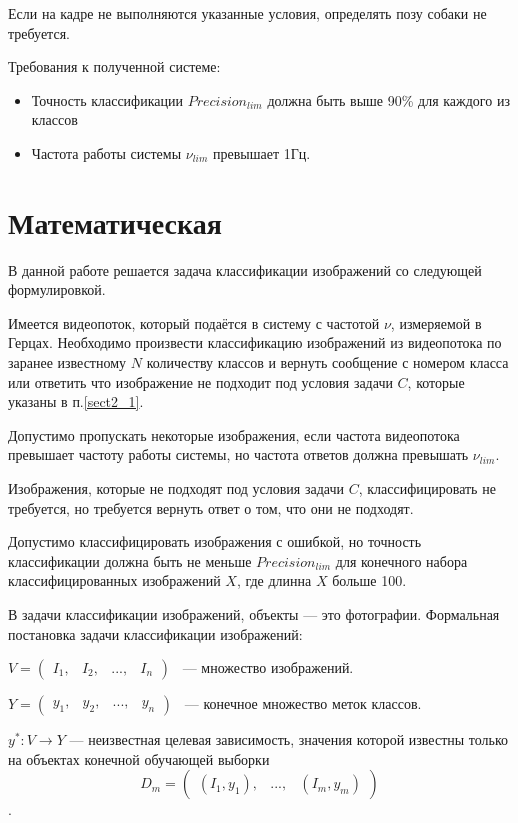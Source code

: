Если на кадре не выполняются указанные условия, определять позу собаки не требуется.

Требования к полученной системе:
\begin{itemize}
    \item Точность классификации $Precision_{lim}$ должна быть выше 90\% для каждого из классов
    \item Частота работы системы $\nu_{lim}$ превышает 1Гц.
\end{itemize}


\section{Математическая}\label{sect2_2}

В данной работе решается задача классификации изображений со следующей формулировкой. 

Имеется видеопоток, который подаётся в систему с частотой $\nu$, измеряемой в Герцах. Необходимо произвести классификацию изображений из видеопотока по заранее известному $N$ количеству классов и вернуть сообщение с номером класса или ответить что изображение не подходит под условия задачи $C$, которые указаны в п.\ref{sect2_1}. 

Допустимо пропускать некоторые изображения, если частота видеопотока превышает частоту работы системы, но частота ответов должна превышать $\nu_{lim}$. 

Изображения, которые не подходят под условия задачи $C$, классифицировать не требуется, но требуется вернуть ответ о том, что они не подходят. 

Допустимо классифицировать изображения с ошибкой, но точность классификации должна быть не меньше $Precision_{lim}$ для конечного набора классифицированных изображений $X$, где длинна $X$ больше 100.

В задачи классификации изображений, объекты — это фотографии. Формальная постановка задачи классификации изображений:

$ V = \begin{pmatrix} 
             I_1, & I_2, & ..., & I_n 
      \end{pmatrix}
$
~— множество изображений. 

$ Y = \begin{pmatrix}
                  y_1, & y_2, & ..., & y_n 
      \end{pmatrix}
$
~— конечное множество меток классов.

$y^{*} : V \rightarrow Y$ — неизвестная целевая зависимость, значения которой известны только на объектах конечной обучающей выборки 
\[ D_m = 
        \begin{pmatrix}
             (I_1, y_1), & ..., & (I_m, y_m)
        \end{pmatrix}
\].

